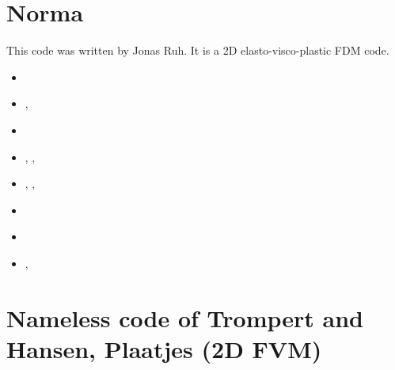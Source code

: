 
\section{Norma}

This code was written by Jonas Ruh. It is a 2D elasto-visco-plastic FDM code.

\begin{small}
\begin{itemize}
\item[2017] \textcite{ruh_17}
\item[2018] \textcite{ruvb18}, \textcite{ruve18}
\item[2019] \textcite{grru19}
\item[2020] \textcite{herv20}, \textcite{dara20}, \textcite{ruh20}
\item[2021] \textcite{nabr21}, \textcite{grrs21}, \textcite{raru21}
\item[2022] \textcite{rutb22}
\item[2023] \textcite{naru23}
\item[2024] \textcite{rubt24}, \textcite{gorn24}
\end{itemize}
\end{small}




\section{Nameless code of Trompert and Hansen, Plaatjes (2D FVM)}

